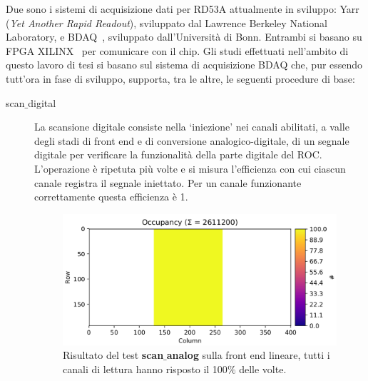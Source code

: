 Due sono i sistemi di acquisizione dati per RD53A attualmente in sviluppo: Yarr~\cite{YARR} (\textit{Yet Another Rapid Readout}), sviluppato dal Lawrence Berkeley National Laboratory, e BDAQ~\cite{BDAQ}, sviluppato dall'Università di Bonn. Entrambi si basano su FPGA XILINX~\cite{xilinx} per comunicare con il chip. 
Gli studi effettuati nell'ambito di questo lavoro di tesi si basano sul sistema di acquisizione BDAQ che, pur essendo tutt'ora in fase di sviluppo, supporta, tra le altre, le seguenti procedure di base:
\begin{description}

\item[scan$\_$digital] La scansione digitale consiste nella `iniezione' nei canali abilitati, a valle degli stadi di front end e di conversione analogico-digitale, di un segnale digitale per verificare la funzionalità della parte digitale del ROC. L'operazione \`e ripetuta più volte e si misura l'efficienza con cui ciascun canale registra il segnale iniettato. Per un canale funzionante correttamente questa efficienza \`e 1.%

\begin{figure}
\centering
\includegraphics[width=\textwidth]{Immagini/ScanAnalogLinear}
\caption{Risultato del test \textbf{scan$\_$analog} sulla front end lineare, tutti i canali di lettura hanno risposto il 100$\%$ delle volte.}
\label{ScanAnalogLinear}
\end{figure}


\end{description}

